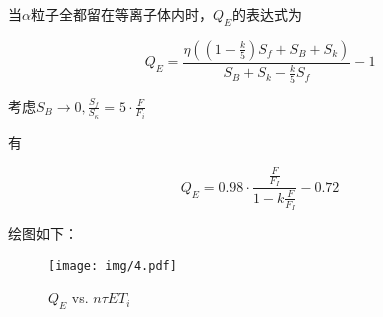 \documentclass{article}
\begin{document}
当$\alpha$粒子全都留在等离子体内时，$Q_E$的表达式为

$$Q_E = \frac{\eta\left(\left(1 - \frac{k}{5}\right)S_f + S_B + S_k\right)}{S_B + S_k - \frac{k}{5}S_f} - 1$$

考虑$S_B\rightarrow0, \frac{S_f}{S_\kappa}=5\cdot\frac{F}{F_i}$

有

$$Q_E = 0.98\cdot\frac{\frac{F}{F_I}}{1-k\frac{F}{F_I}} - 0.72$$

绘图如下：

\begin{figure}[htpb]
    \centering
    \texttt{[image: img/4.pdf]}
    \caption{$Q_E$ vs. $n\tau E T_i$}
    \label{fig:4}
\end{figure}
\end{document}
